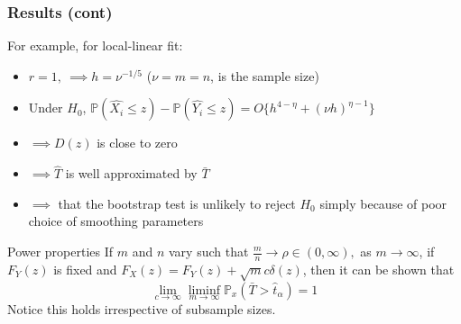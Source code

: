 \documentclass[10pt,dvipsnames,table]{beamer}
\newcommand{\Prob}{\mathds{P}}
\begin{document}
\begin{frame}
\frametitle{Results (cont)}
For example, for local-linear fit: 
\begin{itemize}
\item \pause $r = 1,\ \implies h = \nu^{-1/5}$ \hspace{1in} ($\nu = m = n$, is the sample size)
\item \pause Under $H_0$, $\Prob(\hat{X_i} \leq z) - \Prob(\hat{Y_i} \leq z) = O\{h^{4 - \eta} + (\nu h)^{\eta - 1}\}$ 
\item \pause $\implies D(z)$ is close to zero
\item \pause $\implies \hat{T}$ is well approximated by $\bar{T}$
\item \pause $\implies$ that the bootstrap test is unlikely to reject $H_0$ simply because of poor choice of smoothing parameters
\end{itemize}
\pause
\begin{block}{Power properties}
If $m$ and $n$ vary such that $\frac{m}{n} \rightarrow \rho \in (0, \infty),$ as $m \rightarrow \infty$, if $F_Y(z)$ is fixed and $F_X(z) = F_Y(z) + \sqrt{m}c\delta(z)$, then it can be shown that \[\lim_{c \rightarrow \infty} \liminf\limits_{m \rightarrow \infty} \Prob_x(\bar{T} > \hat{t}_{\alpha}) = 1\]
Notice this holds irrespective of subsample sizes.
\end{block}
\end{frame}

\end{document}
